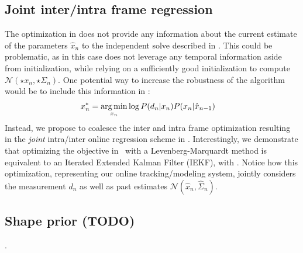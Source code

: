 \subsection{Joint inter/intra frame regression}
The optimization in  does not provide any information about the current estimate of the parameters $\hat{x}_n$ to the independent solve described in . This could be problematic, as in this case  does not leverage any temporal information aside from initialization, while relying on a sufficiently good initialization to compute $\mathcal{N}(\star{x}_n, \star{\Sigma}_n)$. One potential way to increase the robustness of the algorithm would be to include this information in :
% 
\begin{align}
x_n^* &= \operatorname*{arg\,min}_{x_n} \log  P(d_n|x_n) P(x_n |\hat{x}_{n - 1}) 
\label{eq:independenttemp}
\end{align}
% 
Instead, we propose to coalesce the inter and intra frame optimization resulting in the \emph{joint} intra/inter online regression scheme in . Interestingly, we demonstrate that optimizing the objective in~ with a Levenberg-Marquardt method is equivalent to an Iterated Extended Kalman Filter (IEKF), with .
% 
Notice how this optimization, representing our online tracking/modeling system, jointly considers the measurement $d_n$ as well as past estimates $\mathcal{N}(\hat{x}_n, \hat{\Sigma}_n)$.
\newpage

\subsection{Shape prior (TODO)}
\label{sec:shapeprior}
. 
